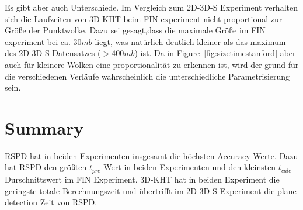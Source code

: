 \documentclass[main.tex]{subfiles}
\begin{document}
Es gibt aber auch Unterschiede. Im Vergleich zum 2D-3D-S Experiment verhalten sich die Laufzeiten von 3D-KHT beim 
FIN experiment nicht proportional zur Größe der Punktwolke. Dazu sei gesagt,dass die maximale Größe im FIN experiment
bei ca. $30mb$ liegt, was natürlich deutlich kleiner als das maximum des 2D-3D-S Datensatzes ($>400mb$) ist.
Da in Figure~\ref{fig:sizetimestanford} aber auch für kleinere Wolken eine proportionalität zu erkennen ist, wird 
der grund für die verschiedenen Verläufe wahrscheinlich die unterschiedliche Parametrisierung sein.


\section{Summary}

RSPD hat in beiden Experimenten insgesamt die höchsten Accuracy Werte. Dazu hat RSPD den größten $t_{pre}$
Wert in beiden Experimenten und den kleinsten $t_{calc}$ Durschnittswert im FIN Experiment. 
3D-KHT hat in beiden Experiment die geringste totale Berechnungszeit und übertrifft im 2D-3D-S Experiment die 
plane detection Zeit von RSPD.

\end{document}
